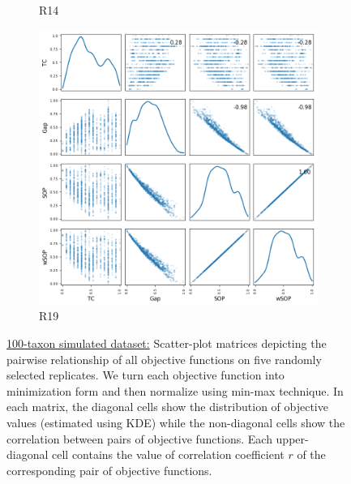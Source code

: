 \begin{figure}[!htbp]
\begin{adjustwidth}{-1cm}{-1cm}
\begin{subfigure}{0.35\textwidth}
		\caption{R14}
	\end{subfigure}
	\begin{subfigure}{0.35\textwidth}
		\includegraphics[width=\columnwidth]{Figure/NumGaps_SOP_TC_wSOP/precomputedInit/R19/fig/scatter_mattrix}
		\caption{R19}
	\end{subfigure}
	\caption{\underline{100-taxon simulated dataset:} Scatter-plot matrices depicting the pairwise relationship of all objective functions on five randomly selected replicates. We turn each objective function into minimization form and then normalize using min-max technique. In each matrix, the diagonal cells show the distribution of objective values (estimated using KDE) while the non-diagonal cells show the correlation between pairs of objective functions. Each upper-diagonal cell contains the value of correlation coefficient $r$ of the corresponding pair of objective functions.}
	\label{fig:nature_obj}
	\end{adjustwidth}
\end{figure}

